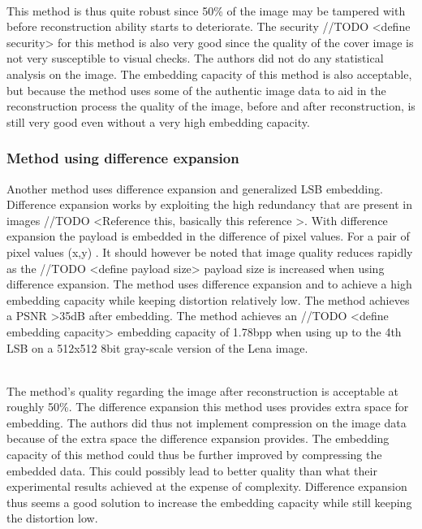 \documentclass[12pt]{article}
\begin{document}
\hspace{0pt} \\
This method \cite {korus2013efficient} is thus quite robust since 50\% of the image may be tampered with before reconstruction ability starts to deteriorate.
The security //TODO <define security> for this method is also very good since the quality of the cover image is not very susceptible to visual checks.
The authors did not do any statistical analysis on the image.
The embedding capacity of this method is also acceptable, but because the method uses some of the authentic image data to aid in the reconstruction process the quality of the image, before and after reconstruction, is still very good even without a very high embedding capacity.  

\subsubsection{Method using difference expansion}
\label{differenceExpansionOverview}
Another method \cite {tian2003high} uses difference expansion and generalized LSB embedding.
Difference expansion works by exploiting the high redundancy that are present in images 
//TODO <Reference this, basically this reference \cite {tian2003high}>.
With difference expansion the payload is embedded in the difference of pixel values. 
For a pair of pixel values (x,y) \cite {tian2002reversible}. 
It should however be noted that image quality reduces rapidly as the  
//TODO <define payload size>
payload size is increased when using difference expansion. 
The method uses difference expansion and to achieve a high embedding capacity while keeping distortion relatively low.
The method achieves a PSNR \textgreater 35dB after embedding.
The method achieves an 
//TODO <define embedding capacity>
embedding capacity of 1.78bpp when using up to the 4th LSB on a 512x512 8bit gray-scale version of the Lena image.

\hspace{0pt} \\
The method's \cite {tian2003high} quality regarding the image after reconstruction is acceptable at roughly 50\%. 
The difference expansion this method uses provides extra space for embedding.
The authors did thus not implement compression on the image data because of the extra space the difference expansion provides.
The embedding capacity of this method could thus be further improved by compressing the embedded data. 
This could possibly lead to better quality than what their experimental results achieved at the expense of complexity.
Difference expansion thus seems a good solution to increase the embedding capacity while still keeping the distortion low.
\end{document}
